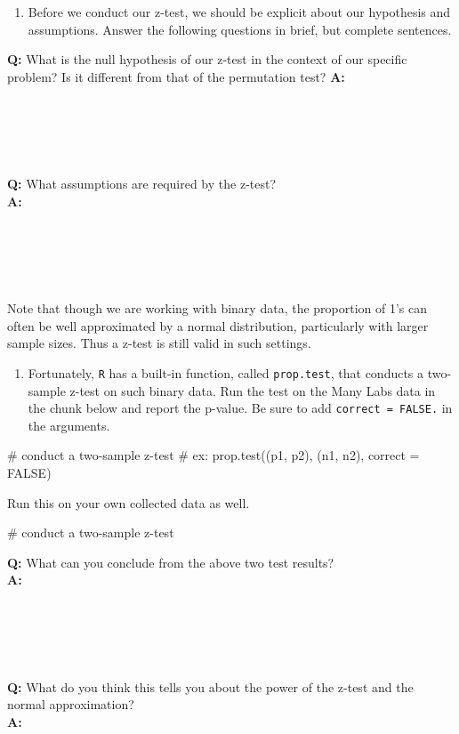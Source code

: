 \documentclass[
  letterpaper,
  DIV=11,
  numbers=noendperiod]{scrartcl}
\newenvironment{Shaded}{\begin{snugshade}}{\end{snugshade}}
\newcommand{\CommentTok}[1]{\textcolor[rgb]{0.37,0.37,0.37}{#1}}
\providecommand{\tightlist}{%
  \setlength{\itemsep}{0pt}\setlength{\parskip}{0pt}}
\begin{document}
\begin{enumerate}
\def\labelenumi{\arabic{enumi}.}
\setcounter{enumi}{8}
\tightlist
\item
  Before we conduct our z-test, we should be explicit about our
  hypothesis and assumptions. Answer the following questions in brief,
  but complete sentences.
\end{enumerate}

\textbf{Q:} What is the null hypothesis of our z-test in the context of
our specific problem? Is it different from that of the permutation test?
\textbf{A:}\\
\strut \\
\strut \\
\strut \\

\textbf{Q:} What assumptions are required by the z-test?\\
\textbf{A:}\\
\strut \\
\strut \\
\strut \\

Note that though we are working with binary data, the proportion of 1's
can often be well approximated by a normal distribution, particularly
with larger sample sizes. Thus a z-test is still valid in such settings.

\begin{enumerate}
\def\labelenumi{\arabic{enumi}.}
\setcounter{enumi}{9}
\tightlist
\item
  Fortunately, \texttt{R} has a built-in function, called
  \texttt{prop.test}, that conducts a two-sample z-test on such binary
  data. Run the test on the Many Labs data in the chunk below and report
  the p-value. Be sure to add \texttt{correct\ =\ FALSE.} in the
  arguments.
\end{enumerate}

\begin{Shaded}
\begin{Highlighting}[]
\CommentTok{\# conduct a two{-}sample z{-}test}
\CommentTok{\# ex: prop.test((p1, p2), (n1, n2), correct = FALSE)}
\end{Highlighting}
\end{Shaded}

Run this on your own collected data as well.

\begin{Shaded}
\begin{Highlighting}[]
\CommentTok{\# conduct a two{-}sample z{-}test}
\end{Highlighting}
\end{Shaded}

\textbf{Q:} What can you conclude from the above two test results?\\
\textbf{A:}\\
\strut \\
\strut \\
\strut \\

\textbf{Q:} What do you think this tells you about the power of the
z-test and the normal approximation?\\
\textbf{A:}\\
\strut \\
\strut \\
\strut \\
\end{document}
